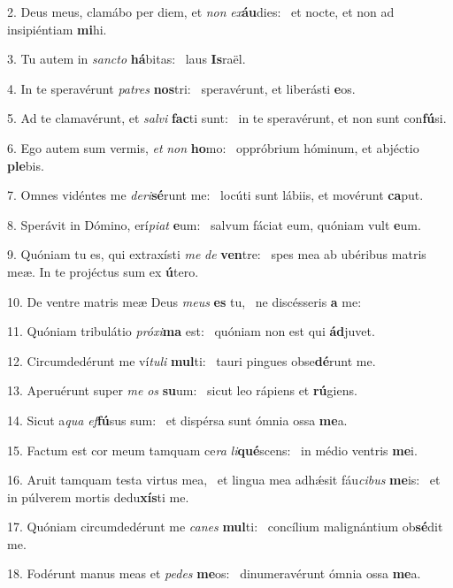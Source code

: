 2. Deus meus, clamábo per diem, et \textit{non} \textit{ex}\textbf{áu}dies: \ast\  et nocte, et non ad insipiéntiam \textbf{mi}hi.\

3. Tu autem in \textit{sanc}\textit{to} \textbf{há}bitas: \ast\  laus \textbf{Is}raël.\

4. In te speravérunt \textit{pa}\textit{tres} \textbf{nos}tri: \ast\  speravérunt, et liberásti \textbf{e}os.\

5. Ad te clamavérunt, et \textit{sal}\textit{vi} \textbf{fac}ti sunt: \ast\  in te speravérunt, et non sunt con\textbf{fú}si.\

6. Ego autem sum vermis, \textit{et} \textit{non} \textbf{ho}mo: \ast\  oppróbrium hóminum, et abjéctio \textbf{ple}bis.\

7. Omnes vidéntes me \textit{de}\textit{ri}\textbf{sé}runt me: \ast\  locúti sunt lábiis, et movérunt \textbf{ca}put.\

8. Sperávit in Dómino, erí\textit{pi}\textit{at} \textbf{e}um: \ast\  salvum fáciat eum, quóniam vult \textbf{e}um.\

9. Quóniam tu es, qui extraxísti \textit{me} \textit{de} \textbf{ven}tre: \ast\  spes mea ab ubéribus matris meæ. In te projéctus sum ex \textbf{ú}tero.\

10. De ventre matris meæ Deus \textit{me}\textit{us} \textbf{es} tu, \ast\  ne discésseris \textbf{a} me:\

11. Quóniam tribulátio \textit{pró}\textit{xi}\textbf{ma} est: \ast\  quóniam non est qui \textbf{ád}juvet.\

12. Circumdedérunt me ví\textit{tu}\textit{li} \textbf{mul}ti: \ast\  tauri pingues obse\textbf{dé}runt me.\

13. Aperuérunt super \textit{me} \textit{os} \textbf{su}um: \ast\  sicut leo rápiens et \textbf{rú}giens.\

14. Sicut a\textit{qua} \textit{ef}\textbf{fú}sus sum: \ast\  et dispérsa sunt ómnia ossa \textbf{me}a.\

15. Factum est cor meum tamquam ce\textit{ra} \textit{li}\textbf{qué}scens: \ast\  in médio ventris \textbf{me}i.\

16. Aruit tamquam testa virtus mea, \dag\  et lingua mea adhǽsit fáu\textit{ci}\textit{bus} \textbf{me}is: \ast\  et in púlverem mortis dedu\textbf{xís}ti me.\

17. Quóniam circumdedérunt me \textit{ca}\textit{nes} \textbf{mul}ti: \ast\  concílium malignántium ob\textbf{sé}dit me.\

18. Fodérunt manus meas et \textit{pe}\textit{des} \textbf{me}os: \ast\  dinumeravérunt ómnia ossa \textbf{me}a.\

